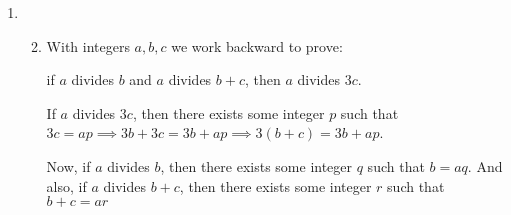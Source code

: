 \documentclass[12pt,letterpaper]{article}
\begin{document}
\begin{enumerate}
\begin{enumerate}
\begin{enumerate}
              \begin{proof}
                We prove this by cases.

                \begin{enumerate}[label=Case \arabic*]
                  \item $a \geq 0$

                    Assume $-b \leq a \leq b$.

                    Since $a \geq 0$, we have $|a| = a$.

                    We have $-b \leq a \leq b \implies a \leq b$.

                    Then, $a = |a| \leq b$.

                    Thus, if $-b \leq a \leq b$, then $|a| \leq b$.
                  \item $a < 0$

                    Assume $-b \leq a \leq b$.

                    Since $a < 0$, we have $|a| = -a$.

                    We have $-b \leq a \leq b \implies -b \leq a \implies -a - b \leq 0 \implies -a \leq b$.

                    Then $-a = |a| \leq b$.

                    Thus, if $-b \leq a \leq b$, then $|a| \leq b$.
                \end{enumerate}

                Since these are the only possible cases,
                we have proved by exhaustion that:

                If $-b \leq a \leq b$, then $|a| \leq b$.
              \end{proof}
          \end{enumerate}
        \setcounter{enumii}{8}
        \item
          \begin{enumerate}
            \setcounter{enumiii}{1}
            \item
              With integers $a, b, c$ we work backward to prove:

              if $a$ divides $b$ and $a$ divides $b + c$, then $a$ divides $3c$.

              If $a$ divides $3c$,
              then there exists some integer $p$ such that $3c = ap \implies 3b + 3c = 3b + ap \implies 3(b + c) = 3b + ap$.

              Now, if $a$ divides $b$, then there exists some integer $q$ such that $b = aq$.
              And also, if $a$ divides $b + c$, then there exists some integer $r$ such that $b + c = ar$


\end{enumerate}
\end{enumerate}
\end{enumerate}
\end{document}
